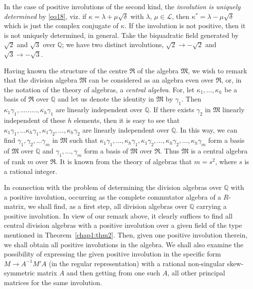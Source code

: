 \begin{remark*}
\label{rem:p22}
In the case of positive involutions of the second kind, the {\em
  involution is uniquely determined} by \eqref{eq18}, viz. if $\kappa =
\lambda + \mu \sqrt{\delta}$ with $\lambda$, $\mu \in \mathscr{L}$,
then $\kappa^{\ast} = \lambda - \mu \sqrt{\delta}$ which is just the
complex conjugate of $\kappa$. If the involution is not positive, then
it is not uniquely determined, in general. Take the biquadratic field
generated by $\sqrt{2}$ and $\sqrt{3}$ over $\mathbb{Q}$; we have two
distinct involutions, $\sqrt{2}\rightarrow - \sqrt{2}$ and $\sqrt{3}
\rightarrow - \sqrt{3}$.

Having known the structure of the centre $\mathfrak{R}$ of the algebra
$\mathfrak{M}$, we wish to remark that the division algebra
$\mathfrak{M}$ can be considered as an algebra even over
$\mathfrak{R}$, or, in the notation of the theory of algebras, a {\em
  central algebra}. For, let $\kappa_1,\ldots, \kappa_h$ be a
basis of $\mathfrak{R}$ over \pageoriginale $\mathbb{Q}$ and let us
denote the identity in $\mathfrak{M}$ by $\gamma_1$. Then $\kappa_1
\gamma_1, \ldots \ldots \ldots , \kappa_h \gamma_1$ are linearly
independent over $\mathbb{Q}$. If there exists $\gamma_2$ in
$\mathfrak{M}$ linearly independent of these $h$ elements, then it is
easy to see that $\kappa_1 \gamma_1, \ldots\kappa_h \gamma_1, \kappa_1
\gamma_2, \ldots, \kappa_h \gamma_2 $ are linearly independent over
$\mathbb{Q}$. In this way, we can find $\gamma_1,\gamma_2,\ldots
\gamma_m $ in $\mathfrak{M}$ such that $\kappa_1 \gamma_1,\ldots,
\kappa_h \gamma_1, \kappa_1 \gamma_2,\ldots, \kappa_h \gamma_2,
\ldots, \kappa_h \gamma_m$ form a basis of $\mathfrak{M}$ over
$\mathbb{Q}$ and $\gamma_1,\ldots, \gamma_m$ form a basis of
$\mathfrak{M}$ over $\mathfrak{R}$. Thus $\mathfrak{M}$ is a central
algebra of rank $m$ over $\mathfrak{R}$. It is known from the theory
of algebras that $m=s^2$, where $s$ is a rational integer.

In connection with the problem of determining the division algebras
over $\mathbb{Q}$ with a positive involution, occurring as the
complete commutator algebra of a $R$-matrix, we shall find, as a first
step, all division algebras over $\mathbb{Q}$ carrying a positive
involution. In view of our remark above, it clearly suffices to find
all central division algebras with a positive involution over a given
field of the type mentioned in Theorem~\ref{chap1:thm2}. Then, given one positive
involution therein, we shall obtain all positive involutions in the
algebra. We shall also examine the possibility of expressing the given
positive involution in the specific form $M\rightarrow A^{-1} M' A$
(in the regular representation) with a rational non-singular
skew-symmetric matrix $A$ and then getting from one such $A$, all
other principal matrices for the same involution.


\end{remark*}
